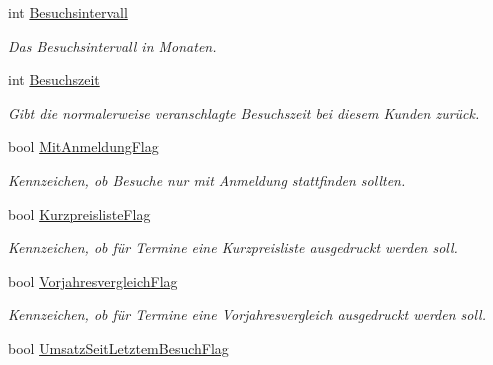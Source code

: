 \begin{DoxyCompactItemize}
int \hyperlink{class_products_1_1_model_1_1_entities_1_1_kunde_a59788f52a115d0a11df21499dd7214c0}{Besuchsintervall}
\begin{DoxyCompactList}\small\item\em Das Besuchsintervall in Monaten. \end{DoxyCompactList}\item 
int \hyperlink{class_products_1_1_model_1_1_entities_1_1_kunde_a84483e77b49dae74d087dac0d4dd27c4}{Besuchszeit}
\begin{DoxyCompactList}\small\item\em Gibt die normalerweise veranschlagte Besuchszeit bei diesem Kunden zurück. \end{DoxyCompactList}\item 
bool \hyperlink{class_products_1_1_model_1_1_entities_1_1_kunde_ac4e2d0ce4a1eaa62807bf430a784d815}{Mit\+Anmeldung\+Flag}
\begin{DoxyCompactList}\small\item\em Kennzeichen, ob Besuche nur mit Anmeldung stattfinden sollten. \end{DoxyCompactList}\item 
bool \hyperlink{class_products_1_1_model_1_1_entities_1_1_kunde_a7a945f2488892792cdb345445d153bde}{Kurzpreisliste\+Flag}
\begin{DoxyCompactList}\small\item\em Kennzeichen, ob für Termine eine Kurzpreisliste ausgedruckt werden soll. \end{DoxyCompactList}\item 
bool \hyperlink{class_products_1_1_model_1_1_entities_1_1_kunde_a08446c7a95cf7913366a586873722f62}{Vorjahresvergleich\+Flag}
\begin{DoxyCompactList}\small\item\em Kennzeichen, ob für Termine eine Vorjahresvergleich ausgedruckt werden soll. \end{DoxyCompactList}\item 
bool \hyperlink{class_products_1_1_model_1_1_entities_1_1_kunde_ad3b0cb9150b871efef603b710d5d8a62}{Umsatz\+Seit\+Letztem\+Besuch\+Flag}

\end{DoxyCompactItemize}
